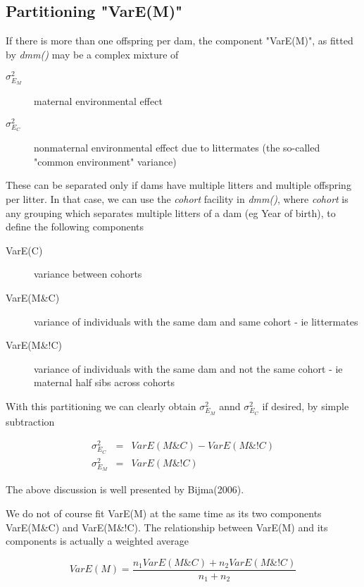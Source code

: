 \documentclass[titlepage]{article}  %
\begin{document}
\subsection{Partitioning "VarE(M)"}

If there is more than one offspring per dam, the component "VarE(M)", as fitted by {\em dmm()} may be a complex mixture of 

\begin{description}
\item [$\sigma^{2}_{E_{M}}$] maternal environmental effect
\item [$\sigma^{2}_{E_{C}}$] nonmaternal environmental effect due to littermates (the so-called "common environment" variance)
\end{description}

These can be separated only if dams have multiple litters and multiple offspring per litter. In that case, we can use the {\em cohort} facility in {\em dmm()}, where {\em cohort} is any grouping which separates multiple litters of a dam (eg Year of birth), to define the following components

\begin{description}
\item [VarE(C)]  variance between cohorts
\item [VarE(M\&C)] variance of individuals with the same dam and same cohort - ie littermates
\item [VarE(M\&!C)] variance of individuals with the same dam and not the same cohort - ie maternal half sibs across cohorts
\end{description}

With this partitioning we can clearly obtain $\sigma^{2}_{E_{M}}$ annd $\sigma^{2}_{E_{C}}$ if desired, by simple subtraction

\begin{eqnarray*}
\sigma^{2}_{E_{C}} & = & VarE(M\&C) - VarE(M\&!C) \\
\sigma^{2}_{E_{M}} & = & VarE(M\&!C)
\end{eqnarray*}

The above discussion is well presented by Bijma(2006)\cite{bijm:06}.

We do not of course fit VarE(M) at the same time as its two components VarE(M\&C) and VarE(M\&!C). The relationship between VarE(M) and its components is actually a weighted average

\begin{displaymath}
VarE(M) = \frac{n_{1} VarE(M\&C) + n_{2} VarE(M\&!C)}{n_{1} + n_{2}}
\end{displaymath}
\end{document}

